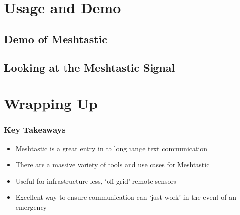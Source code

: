 \documentclass[aspectratio=169]{beamer}
\begin{document}
\section{Usage and Demo}
\subsection{Demo of Meshtastic}
\frame{\subsectionpage}

\subsection{Looking at the Meshtastic Signal}
\frame{\subsectionpage}

\section{Wrapping Up}
\frame{\sectionpage}

\begin{frame}
  \frametitle{Key Takeaways}
  \begin{itemize}[<+->]
    \item{Meshtastic is a great entry in to long range text communication}
    \item{There are a massive variety of tools and use cases for Meshtastic}
    \item{Useful for infrastructure-less, `off-grid' remote sensors}
    \item{Excellent way to ensure communication can `just work' in the event of an emergency}
  \end{itemize}
\end{frame}
\end{document}
